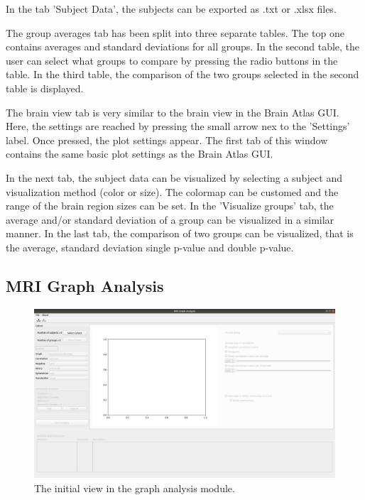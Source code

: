 \documentclass{article}
\begin{document}
In the tab 'Subject Data', the subjects can be exported as .txt or .xlsx files.

The group averages tab has been split into three separate tables. The top one contains averages and standard deviations for all groups. In the second table, the user can select what groups to compare by pressing the radio buttons in the table. In the third table, the comparison of the two groups selected in the second table is displayed.

The brain view tab is very similar to the brain view in the Brain Atlas GUI. Here, the settings are reached by pressing the small arrow nex to the 'Settings' label. Once pressed, the plot settings appear. The first tab of this window contains the same basic plot settings as the Brain Atlas GUI.

In the next tab, the subject data can be visualized by selecting a subject and visualization method (color or size). The colormap can be customed and the range of the brain region sizes can be set. In the 'Visualize groups' tab, the average and/or standard deviation of a group can be visualized in a similar manner. In the last tab, the comparison of two groups can be visualized, that is the average, standard deviation single p-value and double p-value. 

\subsection{MRI Graph Analysis}
\label{sec:mri_ga}

\begin{figure}[h]
    \centering
    \includegraphics[width=\linewidth]{graph_analysis_locked.png}
    \caption{The initial view in the graph analysis module.}
    \label{fig:locked}
\end{figure}
\end{document}
